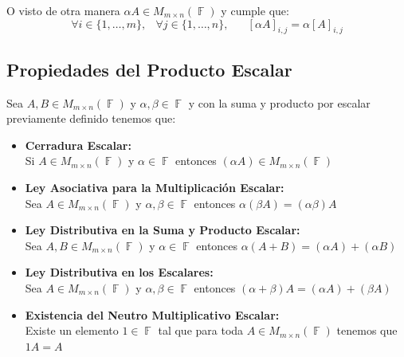 \documentclass[12pt, fleqn]{report}                             %
\DeclareMathOperator \Space {\quad}                             %
\DeclareMathOperator \MiniSpace {\;}                            %
\theoremstyle{break}                                            %
\DeclareMathOperator \GenericField {\mathbb{F}}                 %
\begin{document}
            O visto de otra manera $\alpha A \in M_{m \times n}(\GenericField)$ y cumple que:
            \begin{equation}
                \forall i \in \{1, \dots, m\} ,\MiniSpace
                    \forall j \in \{1, \dots, n\} ,\Space
                        [\alpha A]_{i, j} = \alpha [A]_{i, j}
            \end{equation}

            \subsection{Propiedades del Producto Escalar}

                Sea $A, B \in M_{m \times n}(\GenericField)$ y $\alpha, \beta \in \GenericField$
                y con la suma y producto por escalar previamente definido tenemos que:

                \begin{itemize}

                    \item \textbf{Cerradura Escalar:}\\
                        Si $A\in M_{m \times n}(\GenericField)$ y $\alpha \in \GenericField$ entonces 
                        $(\alpha A) \in M_{m \times n}(\GenericField)$

                    \item \textbf{Ley Asociativa para la Multiplicación Escalar:}\\
                        Sea $A \in M_{m \times n}(\GenericField)$ y $\alpha, \beta \in \GenericField$
                        entonces $\alpha(\beta A) = (\alpha \beta)A$

                    \item \textbf{Ley Distributiva en la Suma y Producto Escalar:}\\
                        Sea $A, B \in M_{m \times n}(\GenericField)$ y $\alpha \in \GenericField$
                        entonces $\alpha(A + B) = (\alpha A) + (\alpha B)$

                    \item \textbf{Ley Distributiva en los Escalares:}\\
                        Sea $A \in M_{m \times n}(\GenericField)$ y $\alpha, \beta \in \GenericField$
                        entonces $(\alpha + \beta)A = (\alpha A) + (\beta A)$

                    \item \textbf{Existencia del Neutro Multiplicativo Escalar:}\\
                        Existe un elemento $1 \in \GenericField$ tal que para toda
                            $A \in M_{m \times n}(\GenericField)$ tenemos que $1A = A$

                \end{itemize}
\end{document}
